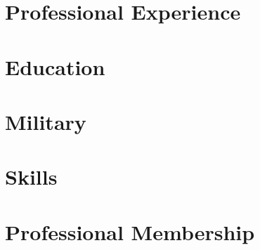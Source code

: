\documentclass[letter,10pt]{article}
\begin{document}


\section{Professional Experience}


\section{Education}


\section{Military}


\section{Skills}



\section{Professional Membership}

\end{document}
